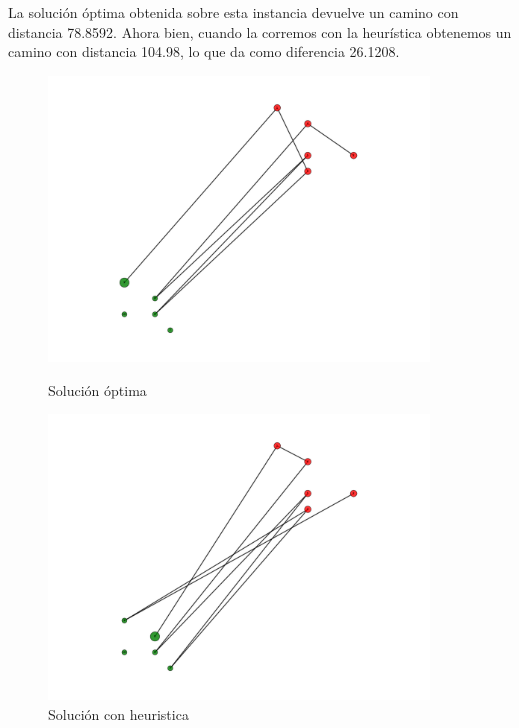 \newpage

La solución óptima obtenida sobre esta instancia devuelve un camino con distancia 78.8592.
Ahora bien, cuando la corremos con la heurística obtenemos un camino con distancia 104.98, lo que da como diferencia 26.1208.

\begin{figure}[H]
\centering
\begin{minipage}{0.45\textwidth}
\includegraphics[width=0.9\textwidth]{imagenes/test1-soltest1BT.pdf}
\caption{Solución óptima}
\label{fig:ej2_caso1bt}
\end{minipage}
\qquad
\begin{minipage}{0.45\textwidth}
\includegraphics[width=0.9\textwidth]{imagenes/test1-soltest1H.pdf}
\caption{Solución con heuristica}
\label{fig:ej2_caso1h}
\end{minipage}
\end{figure}


